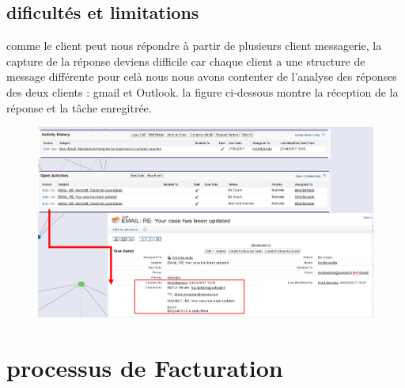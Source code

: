 \documentclass[a4paper, 12pt]{report}
\begin{document}
\begin{itemize}
\subsection {dificultés et limitations}
comme le client peut nous répondre à partir de plusieurs client messagerie, la capture de la réponse deviens difficile car chaque client a une structure de message différente 
pour celà nous nous avons contenter de l'analyse des réponses des deux clients : gmail et Outlook.
la figure ci-dessous montre la réception de la réponse et la tâche enregitrée.
\begin{figure}[H]
	\centering
		\includegraphics{reponsemail.PNG}
	\label{fig:Interface de la réception de la réponse par mail}
\end{figure}
\section {processus de Facturation}

\end{itemize}
\end{document}
